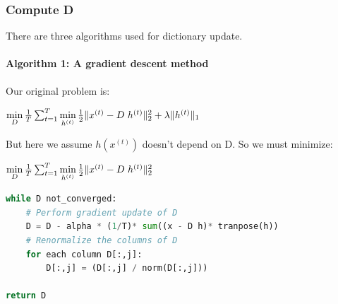\documentclass[a4paper,10pt]{article}
\begin{document}
\subsubsection{Compute D}
There are three algorithms used for  dictionary update.
\paragraph{Algorithm 1: A gradient descent method}
Our original problem is:
\begin{center}
 $\min\limits_{D} \frac{1}{T} \sum_{t=1}^{T}  \min\limits_{h^{(t)}} \frac{1}{2} \| x^{(t)} - D \hspace{3px} h^{(t)} \|_2^2 + \lambda \|h^{(t)} \|_1$\\
\end{center}
But here we assume $h(x^{(t)})$ doesn't depend on D. So we must minimize:
\begin{center}
 $\min\limits_{D} \frac{1}{T} \sum_{t=1}^{T}  \min\limits_{h^{(t)}} \frac{1}{2} \| x^{(t)} - D \hspace{3px} h^{(t)} \|_2^2 $\\
\end{center}
\begin{lstlisting}[language=Python,frame=single]
while D not_converged:
    # Perform gradient update of D
    D = D - alpha * (1/T)* sum((x - D h)* tranpose(h))
    # Renormalize the columns of D
    for each column D[:,j]:
        D[:,j] = (D[:,j] / norm(D[:,j]))

return D
\end{lstlisting}
\end{document}
